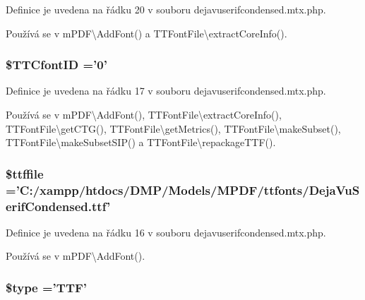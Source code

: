 Definice je uvedena na řádku 20 v souboru dejavuserifcondensed.\-mtx.\-php.



Používá se v m\-P\-D\-F\textbackslash{}\-Add\-Font() a T\-T\-Font\-File\textbackslash{}extract\-Core\-Info().

\hypertarget{dejavuserifcondensed_8mtx_8php_ac3b78779654cec2ec1f552d784f1b5f0}{
\subsubsection[{\$\-T\-T\-Cfont\-I\-D}]{\setlength{\rightskip}{0pt plus 5cm}\$T\-T\-Cfont\-I\-D ='0'}}\label{dejavuserifcondensed_8mtx_8php_ac3b78779654cec2ec1f552d784f1b5f0}


Definice je uvedena na řádku 17 v souboru dejavuserifcondensed.\-mtx.\-php.



Používá se v m\-P\-D\-F\textbackslash{}\-Add\-Font(), T\-T\-Font\-File\textbackslash{}extract\-Core\-Info(), T\-T\-Font\-File\textbackslash{}get\-C\-T\-G(), T\-T\-Font\-File\textbackslash{}get\-Metrics(), T\-T\-Font\-File\textbackslash{}make\-Subset(), T\-T\-Font\-File\textbackslash{}make\-Subset\-S\-I\-P() a T\-T\-Font\-File\textbackslash{}repackage\-T\-T\-F().

\hypertarget{dejavuserifcondensed_8mtx_8php_ab04cc39aa4badf22904a8e6ec08f49a9}{
\subsubsection[{\$ttffile}]{\setlength{\rightskip}{0pt plus 5cm}\$ttffile ='C\-:/xampp/htdocs/D\-M\-P/Models/M\-P\-D\-F/ttfonts/Deja\-Vu\-Serif\-Condensed.\-ttf'}}\label{dejavuserifcondensed_8mtx_8php_ab04cc39aa4badf22904a8e6ec08f49a9}


Definice je uvedena na řádku 16 v souboru dejavuserifcondensed.\-mtx.\-php.



Používá se v m\-P\-D\-F\textbackslash{}\-Add\-Font().

\hypertarget{dejavuserifcondensed_8mtx_8php_a9a4a6fba2208984cabb3afacadf33919}{
\subsubsection[{\$type}]{\setlength{\rightskip}{0pt plus 5cm}\$type ='T\-T\-F'}}\label{dejavuserifcondensed_8mtx_8php_a9a4a6fba2208984cabb3afacadf33919}


